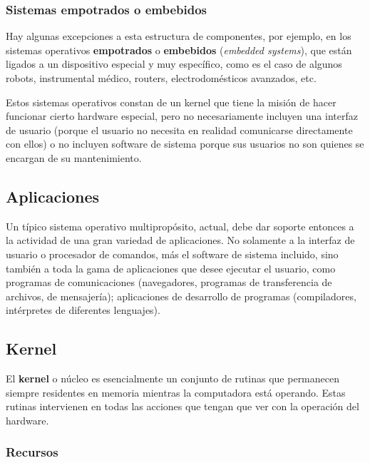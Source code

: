 \documentclass[spanish,a4paper,]{article}
\begin{document}
\hypertarget{sistemas-empotrados-o-embebidos}{%
\subsubsection{Sistemas empotrados o
embebidos}\label{sistemas-empotrados-o-embebidos}}

Hay algunas excepciones a esta estructura de componentes, por ejemplo,
en los sistemas operativos \textbf{empotrados} o \textbf{embebidos}
(\emph{embedded systems}), que están ligados a un dispositivo especial y
muy específico, como es el caso de algunos robots, instrumental médico,
routers, electrodomésticos avanzados, etc.

Estos sistemas operativos constan de un kernel que tiene la misión de
hacer funcionar cierto hardware especial, pero no necesariamente
incluyen una interfaz de usuario (porque el usuario no necesita en
realidad comunicarse directamente con ellos) o no incluyen software de
sistema porque sus usuarios no son quienes se encargan de su
mantenimiento.

\hypertarget{aplicaciones}{%
\subsection{Aplicaciones}\label{aplicaciones}}

Un típico sistema operativo multipropósito, actual, debe dar soporte
entonces a la actividad de una gran variedad de aplicaciones. No
solamente a la interfaz de usuario o procesador de comandos, más el
software de sistema incluido, sino también a toda la gama de
aplicaciones que desee ejecutar el usuario, como programas de
comunicaciones (navegadores, programas de transferencia de archivos, de
mensajería); aplicaciones de desarrollo de programas (compiladores,
intérpretes de diferentes lenguajes).

\hypertarget{kernel}{%
\subsection{Kernel}\label{kernel}}

El \textbf{kernel} o núcleo es esencialmente un conjunto de rutinas que
permanecen siempre residentes en memoria mientras la computadora está
operando. Estas rutinas intervienen en todas las acciones que tengan que
ver con la operación del hardware.

\hypertarget{recursos}{%
\subsubsection{Recursos}\label{recursos}}
\end{document}
